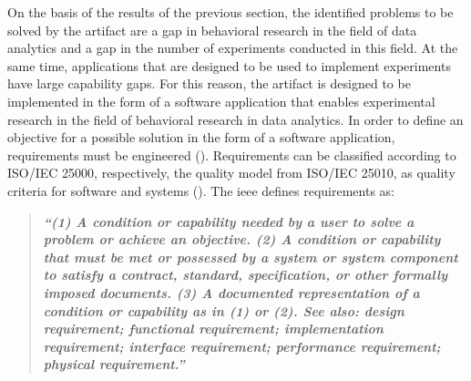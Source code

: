 On the basis of the results of the previous section, the identified problems to be solved by the artifact are a gap in behavioral research in the field of data analytics and a gap in the number of experiments conducted in this field. At the same time, applications that are designed to be used to implement experiments have large capability gaps. For this reason, the artifact is designed to be implemented in the form of a software application that enables experimental research in the field of behavioral research in data analytics. In order to define an objective for a possible solution in the form of a software application, requirements must be engineered (\cite{Seacord.2003}). Requirements can be classified according to ISO/IEC 25000, respectively, the quality model from ISO/IEC 25010, as quality criteria for software and systems (\cite{ISOIEC25010.2011}). The \ac{ieee} defines requirements as:
\begin{quote}
    \textbf{\textit{\enquote{(1) A condition or capability needed by a user to solve a problem or achieve an objective. (2) A condition or capability that must be met or possessed by a system or system component to satisfy a contract, standard, specification, or other formally imposed documents. (3) A documented representation of a condition or capability as in (1) or (2). See also: design requirement; functional requirement; implementation requirement; interface requirement; performance requirement; physical requirement.}}} \cite{IEEE.1990}
\end{quote}  
